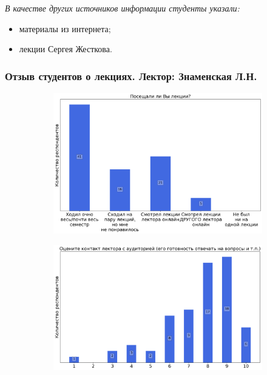 		\textit{В качестве других источников информации студенты указали:} 
		\begin{itemize}
			\item материалы из интернета;
			\item лекции Сергея Жесткова.
		\end{itemize}

	\subsubsection{Отзыв студентов о лекциях. Лектор: Знаменская Л.Н.}

		\begin{figure}[H]
			\centering
			\begin{subfigure}[b]{0.45\textwidth}
				\centering
				\includegraphics[width=\textwidth]{images/1 course/Математический анализ/lecturer-questions-Знаменская Л.Н.-0.png}
			\end{subfigure}
			\begin{subfigure}[b]{0.45\textwidth}
				\centering
				\includegraphics[width=\textwidth]{images/1 course/Математический анализ/lecturer-marks-Знаменская Л.Н.-0.png}

\end{subfigure}
\end{figure}
